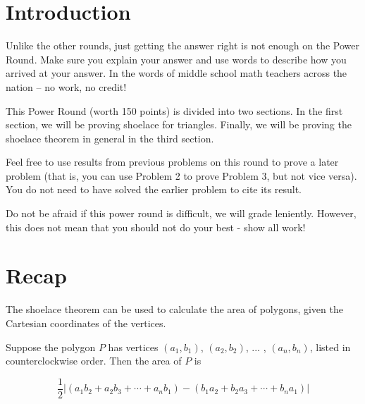 \documentclass[11pt]{article}
\begin{document}
\section{Introduction}

Unlike the other rounds, just getting the answer right is not enough on the Power Round. Make sure you explain your answer and use words to describe how you arrived at your answer. In the words of middle school math teachers across the nation -- no work, no credit!

\phantom{hi} \noindent This Power Round (worth 150 points) is divided into two sections. In the first section,  we will be proving shoelace for triangles. Finally, we will be proving the shoelace theorem in general in the third section.

\phantom{hi} \noindent Feel free to use results from previous problems on this round to prove a later problem (that is, you can use Problem 2 to prove Problem 3, but not vice versa). You do not need to have solved the earlier problem to cite its result.

\phantom{hi} \noindent Do not be afraid if this power round is difficult, we will grade leniently. However, this does not mean that you should not do your best - show all work!

\section{Recap}

The shoelace theorem can be used to calculate the area of polygons, given the Cartesian coordinates of the vertices. 

\begin{theorem} Suppose the polygon $P$ has vertices $(a_1, b_1)$, $(a_2, b_2)$, ... , $(a_n, b_n)$, listed in counterclockwise order. Then the area of $P$ is

\[\dfrac{1}{2} |(a_1b_2 + a_2b_3 + \cdots + a_nb_1) - (b_1a_2 + b_2a_3 + \cdots + b_na_1)|\]
\end{theorem}
\begin{comment}
The Shoelace Theorem gets its name because if one lists the coordinates in a column, 
\begin{align*} 
(a_1 &, b_1) \\ 
(a_2 &, b_2) \\ 
& \vdots \\ 
(a_n &, b_n) \\ 
(a_1 &, b_1) \\ 
\end{align*} 
and marks the pairs of coordinates to be multiplied, the resulting image looks like laced-up shoes.
\end{comment}
\end{document}
